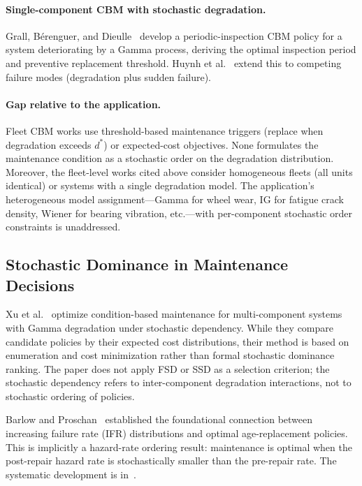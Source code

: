 \documentclass[11pt,a4paper]{article}
\theoremstyle{plain}
\theoremstyle{definition}
\theoremstyle{remark}
\begin{document}
\paragraph{Single-component CBM with stochastic degradation.}
Grall, B\'erenguer, and Dieulle~\cite{grall2002} develop a periodic-inspection CBM policy for a system deteriorating by a Gamma process, deriving the optimal inspection period and preventive replacement threshold. Huynh et al.~\cite{huynh2011} extend this to competing failure modes (degradation plus sudden failure).

\paragraph{Gap relative to the application.}
Fleet CBM works use threshold-based maintenance triggers (replace when degradation exceeds $d^*$) or expected-cost objectives. None formulates the maintenance condition as a stochastic order on the degradation distribution. Moreover, the fleet-level works cited above consider homogeneous fleets (all units identical) or systems with a single degradation model. The application's heterogeneous model assignment---Gamma for wheel wear, IG for fatigue crack density, Wiener for bearing vibration, etc.---with per-component stochastic order constraints is unaddressed.

\subsection{Stochastic Dominance in Maintenance Decisions}
\label{sec:related:s6}

Xu et al.~\cite{xu2021} optimize condition-based maintenance for multi-component systems with Gamma degradation under stochastic dependency. While they compare candidate policies by their expected cost distributions, their method is based on enumeration and cost minimization rather than formal stochastic dominance ranking. The paper does not apply FSD or SSD as a selection criterion; the stochastic dependency refers to inter-component degradation interactions, not to stochastic ordering of policies.

Barlow and Proschan~\cite{barlow1996} established the foundational connection between increasing failure rate (IFR) distributions and optimal age-replacement policies. This is implicitly a hazard-rate ordering result: maintenance is optimal when the post-repair hazard rate is stochastically smaller than the pre-repair rate. The systematic development is in~\cite{shaked2007,muller2002}.
\end{document}
